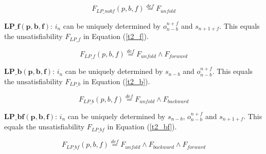\documentclass[journal]{IEEEtran}
\begin{document}
\begin{equation}\label{t2_nobf}
F_{LP\_nobf}(p,b,f)\overset{def}{=} F_{unfold}
\end{equation}

\textbf{$\boldsymbol{LP\_f(p,b,f)}$}:
$i_n$ can be uniquely determined by $o_{n-b}^{n+f}$ and $s_{n+1+f}$.
This equals the unsatisfiability $F_{LP\_f}$ in Equation (\ref{t2_f}).

\begin{equation}\label{t2_f}
F_{LP\_f}(p,b,f)\overset{def}{=} F_{unfold}\wedge F_{forward}
\end{equation}

\textbf{$\boldsymbol{LP\_b(p,b,f)}$}:
$i_n$ can be uniquely determined by $s_{n-b}$ and $o_{n-b}^{n+f}$.
This equals the unsatisfiability $F_{LP\_b}$ in Equation (\ref{t2_b}).


\begin{equation}\label{t2_b}
F_{LP\_b}(p,b,f)\overset{def}{=} F_{unfold}\wedge F_{backward}
\end{equation}


\textbf{$\boldsymbol{LP\_bf(p,b,f)}$}:
$i_n$ can be uniquely determined by $s_{n-b}$, $o_{n-b}^{n+f}$ and $s_{n+1+f}$.
This equals the unsatisfiability $F_{LP\_bf}$ in Equation (\ref{t2_bf}).

\begin{equation}\label{t2_bf}
F_{LP\_bf}(p,b,f)\overset{def}{=} F_{unfold}\wedge F_{backward}\wedge F_{forward}
\end{equation}
\end{document}
